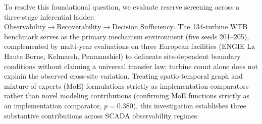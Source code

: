 \documentclass[
  journal]{IEEEtran}
\begin{document}
To resolve this foundational question, we evaluate reserve screening
across a three-stage inferential ladder:
\(\text{Observability} \to \text{Recoverability} \to \text{Decision Sufficiency}\).
The 134-turbine WTB benchmark serves as the primary mechanism
environment (five seeds 201--205), complemented by multi-year
evaluations on three European facilities (ENGIE La Haute Borne,
Kelmarsh, Penmanshiel) to delineate site-dependent boundary conditions
without claiming a universal transfer law; turbine count alone does not
explain the observed cross-site variation. Treating spatio-temporal
graph and mixture-of-experts (MoE) formulations strictly as
implementation comparators rather than novel modeling contributions
(confirming MoE functions strictly as an implementation comparator,
\(p=0.380\)), this investigation establishes three substantive
contributions across SCADA observability regimes:
\end{document}
